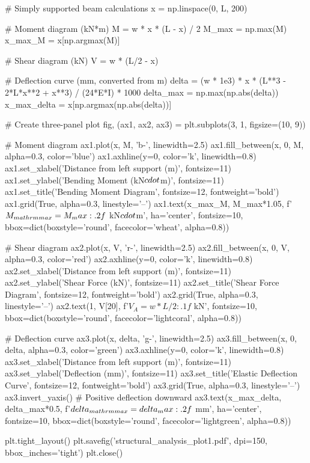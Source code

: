 \documentclass[11pt,a4paper]{article}
\begin{document}
\begin{pycode}
# Simply supported beam calculations
x = np.linspace(0, L, 200)

# Moment diagram (kN*m)
M = w * x * (L - x) / 2
M_max = np.max(M)
x_max_M = x[np.argmax(M)]

# Shear diagram (kN)
V = w * (L/2 - x)

# Deflection curve (mm, converted from m)
delta = (w * 1e3) * x * (L**3 - 2*L*x**2 + x**3) / (24*E*I) * 1000
delta_max = np.max(np.abs(delta))
x_max_delta = x[np.argmax(np.abs(delta))]

# Create three-panel plot
fig, (ax1, ax2, ax3) = plt.subplots(3, 1, figsize=(10, 9))

# Moment diagram
ax1.plot(x, M, 'b-', linewidth=2.5)
ax1.fill_between(x, 0, M, alpha=0.3, color='blue')
ax1.axhline(y=0, color='k', linewidth=0.8)
ax1.set_xlabel('Distance from left support (m)', fontsize=11)
ax1.set_ylabel('Bending Moment (kN$\\cdot$m)', fontsize=11)
ax1.set_title('Bending Moment Diagram', fontsize=12, fontweight='bold')
ax1.grid(True, alpha=0.3, linestyle='--')
ax1.text(x_max_M, M_max*1.05, f'$M_{{\\mathrm{{max}}}} = {M_max:.2f}$ kN$\\cdot$m',
         ha='center', fontsize=10, bbox=dict(boxstyle='round', facecolor='wheat', alpha=0.8))

# Shear diagram
ax2.plot(x, V, 'r-', linewidth=2.5)
ax2.fill_between(x, 0, V, alpha=0.3, color='red')
ax2.axhline(y=0, color='k', linewidth=0.8)
ax2.set_xlabel('Distance from left support (m)', fontsize=11)
ax2.set_ylabel('Shear Force (kN)', fontsize=11)
ax2.set_title('Shear Force Diagram', fontsize=12, fontweight='bold')
ax2.grid(True, alpha=0.3, linestyle='--')
ax2.text(1, V[20], f'$V_{{A}} = {w*L/2:.1f}$ kN', fontsize=10,
         bbox=dict(boxstyle='round', facecolor='lightcoral', alpha=0.8))

# Deflection curve
ax3.plot(x, delta, 'g-', linewidth=2.5)
ax3.fill_between(x, 0, delta, alpha=0.3, color='green')
ax3.axhline(y=0, color='k', linewidth=0.8)
ax3.set_xlabel('Distance from left support (m)', fontsize=11)
ax3.set_ylabel('Deflection (mm)', fontsize=11)
ax3.set_title('Elastic Deflection Curve', fontsize=12, fontweight='bold')
ax3.grid(True, alpha=0.3, linestyle='--')
ax3.invert_yaxis()  # Positive deflection downward
ax3.text(x_max_delta, delta_max*0.5, f'$\\delta_{{\\mathrm{{max}}}} = {delta_max:.2f}$ mm',
         ha='center', fontsize=10, bbox=dict(boxstyle='round', facecolor='lightgreen', alpha=0.8))

plt.tight_layout()
plt.savefig('structural_analysis_plot1.pdf', dpi=150, bbox_inches='tight')
plt.close()
\end{pycode}
\end{document}
